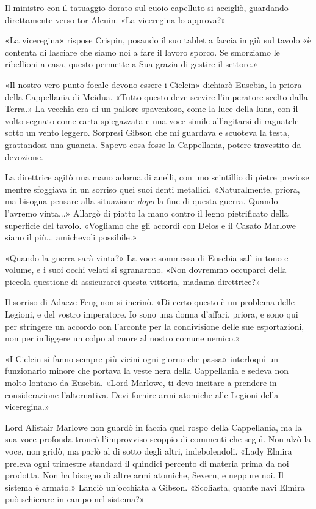 Il ministro con il tatuaggio dorato sul cuoio capelluto si accigliò,
guardando direttamente verso tor Alcuin. «La viceregina lo approva?»

«La viceregina» rispose Crispin, posando il suo tablet a faccia in giù
sul tavolo «è contenta di lasciare che siamo noi a fare il lavoro
sporco. Se smorziamo le ribellioni a casa, questo permette a Sua grazia
di gestire il settore.»

«Il nostro vero punto focale devono essere i Cielcin» dichiarò Eusebia,
la priora della Cappellania di Meidua. «Tutto questo deve servire
l'imperatore scelto dalla Terra.» La vecchia era di un pallore
spaventoso, come la luce della luna, con il volto segnato come carta
spiegazzata e una voce simile all'agitarsi di ragnatele sotto un vento
leggero. Sorpresi Gibson che mi guardava e scuoteva la testa,
grattandosi una guancia. Sapevo cosa fosse la Cappellania, potere
travestito da devozione.

La direttrice agitò una mano adorna di anelli, con uno scintillio di
pietre preziose mentre sfoggiava in un sorriso quei suoi denti
metallici. «Naturalmente, priora, ma bisogna pensare alla situazione
\emph{dopo} la fine di questa guerra. Quando l'avremo vinta...» Allargò
di piatto la mano contro il legno pietrificato della superficie del
tavolo. «Vogliamo che gli accordi con Delos e il Casato Marlowe siano il
più... amichevoli possibile.»

«Quando la guerra sarà vinta?» La voce sommessa di Eusebia salì in tono
e volume, e i suoi occhi velati si sgranarono. «Non dovremmo occuparci
della piccola questione di assicurarci questa vittoria, madama
direttrice?»

Il sorriso di Adaeze Feng non si incrinò. «Di certo questo è un problema
delle Legioni, e del vostro imperatore. Io sono una donna d'affari,
priora, e sono qui per stringere un accordo con l'arconte per la
condivisione delle sue esportazioni, non per infliggere un colpo al
cuore al nostro comune nemico.»

«I Cielcin si fanno sempre più vicini ogni giorno che passa» interloquì
un funzionario minore che portava la veste nera della Cappellania e
sedeva non molto lontano da Eusebia. «Lord Marlowe, ti devo incitare a
prendere in considerazione l'alternativa. Devi fornire armi atomiche
alle Legioni della viceregina.»

Lord Alistair Marlowe non guardò in faccia quel rospo della Cappellania,
ma la sua voce profonda troncò l'improvviso scoppio di commenti che
seguì. Non alzò la voce, non gridò, ma parlò al di sotto degli altri,
indebolendoli. «Lady Elmira preleva ogni trimestre standard il quindici
percento di materia prima da noi prodotta. Non ha bisogno di altre armi
atomiche, Severn, e neppure noi. Il sistema è armato.» Lanciò
un'occhiata a Gibson. «Scoliasta, quante navi Elmira può schierare in
campo nel sistema?»

